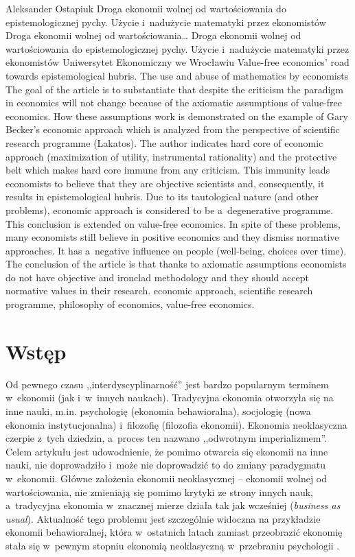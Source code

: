 \begin{artplenv}{Aleksander Ostapiuk}
	{Droga ekonomii wolnej od wartościowania do epistemologicznej pychy. Użycie i~nadużycie matematyki przez
		ekonomistów}
	{Droga ekonomii wolnej od wartościowania\ldots}
	{Droga ekonomii wolnej od wartościowania do epistemologicznej pychy. Użycie i~nadużycie matematyki przez
		ekonomistów}
	{Uniwersytet Ekonomiczny we Wrocławiu\label{ost-start}}
	{Value-free economics' road towards epistemological hubris. The use and abuse of mathematics by economists}
	{The goal of the article is to substantiate that despite the criticism the paradigm in economics will not change because of the axiomatic assumptions of value-free economics. How these assumptions work is demonstrated on the example of Gary Becker's economic approach which is analyzed from the perspective of scientific research programme (Lakatos). The author indicates hard core of economic approach (maximization of utility, instrumental rationality) and the protective belt which makes hard core immune from any criticism. This immunity leads economists to believe that they are objective scientists and, consequently, it results in epistemological hubris. Due to its tautological nature (and other problems), economic approach is considered to be a~degenerative programme. This conclusion is extended on value-free economics. In spite of these problems, many economists still believe in positive economics and they dismiss normative approaches. It has a~negative influence on people (well-being, choices over time). The conclusion of the article is that thanks to axiomatic assumptions economists do not have objective and ironclad methodology and they should accept normative values in their research.}
	{economic approach, scientific research programme, philosophy of economics, value-free economics.}



\section*{Wstęp}
\lettrine[loversize=0.13,lines=2,lraise=-0.05,nindent=0em,findent=0.2pt]%
{O}{}d pewnego czasu ,,interdyscyplinarność'' jest bardzo popularnym terminem w~ekonomii (jak i~w~innych naukach).
Tradycyjna ekonomia otworzyła się na inne nauki, m.in. psychologię (ekonomia behawioralna), socjologię (nowa ekonomia
instytucjonalna) i~filozofię (filozofia ekonomii). Ekonomia neoklasyczna czerpie z~tych dziedzin, a~proces ten nazwano
,,odwrotnym imperializmem''. Celem artykułu jest udowodnienie, że pomimo otwarcia się ekonomii na inne nauki, nie
doprowadziło i~może nie doprowadzić to do zmiany paradygmatu
\parencite{kuhn_structure_1962}
w~ekonomii. Główne
założenia ekonomii neoklasycznej -- ekonomii wolnej od wartościowania, nie zmieniają się pomimo krytyki ze strony innych
nauk, a~tradycyjna ekonomia w~znacznej mierze działa tak jak wcześniej (\textit{business as usual}). Aktualność tego
problemu jest szczególnie widoczna na przykładzie ekonomii behawioralnej, która w~ostatnich latach zamiast przeobrazić
ekonomię stała się w~pewnym stopniu ekonomią neoklasyczną w~przebraniu psychologii
\parencite{berg_as-if_2010}.


\end{artplenv}
